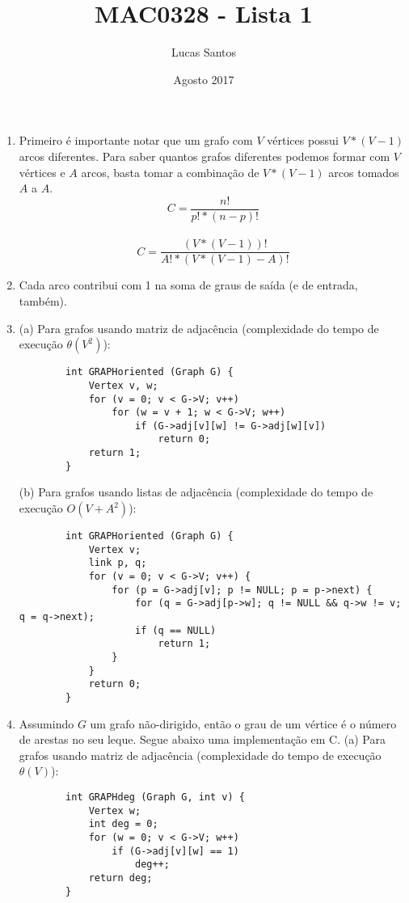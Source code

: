 \documentclass[12pt,letterpaper]{article}
\title{MAC0328 - Lista 1}
\author{Lucas Santos}
\date{Agosto 2017}
\begin{document}
\maketitle

\begin{enumerate}
    \item Primeiro é importante notar que um grafo com $V$ vértices possui $V * (V - 1)$ arcos diferentes. Para saber quantos grafos diferentes podemos formar com $V$ vértices e $A$ arcos, basta tomar a combinação de $V * (V - 1)$ arcos tomados $A$ a $A$.\\
    $$C = \frac{n!}{p! * (n-p)!}$$\\
    $$C = \frac{(V * (V - 1))!}{A! * (V * (V - 1) - A)!}$$
    
    \item Cada arco contribui com 1 na soma de graus de saída (e de entrada, também).
    
    \item 
    \subitem (a) Para grafos usando matriz de adjacência (complexidade do tempo de execução $\theta(V^2)$):
    \begin{lstlisting}
        int GRAPHoriented (Graph G) {
            Vertex v, w;
            for (v = 0; v < G->V; v++)
                for (w = v + 1; w < G->V; w++)
                    if (G->adj[v][w] != G->adj[w][v])
                        return 0;
            return 1;
        }
    \end{lstlisting}
    
    \subitem (b) Para grafos usando listas de adjacência (complexidade do tempo de execução $O(V+A^2)$):
    \begin{lstlisting}
        int GRAPHoriented (Graph G) {
            Vertex v;
            link p, q;
            for (v = 0; v < G->V; v++) {
                for (p = G->adj[v]; p != NULL; p = p->next) {
                    for (q = G->adj[p->w]; q != NULL && q->w != v; q = q->next);
                    if (q == NULL)
                        return 1;
                }
            }
            return 0;
        }
    \end{lstlisting}
    
    \item Assumindo $G$ um grafo não-dirigido, então o grau de um vértice é o número de arestas no seu leque. Segue abaixo uma implementação em C.
    \subitem (a) Para grafos usando matriz de adjacência (complexidade do tempo de execução $\theta(V)$):
    \begin{lstlisting}
        int GRAPHdeg (Graph G, int v) {
            Vertex w;
            int deg = 0;
            for (w = 0; v < G->V; w++)
                if (G->adj[v][w] == 1)
                    deg++;
            return deg;
        }
    \end{lstlisting}
    

\end{enumerate}
\end{document}
